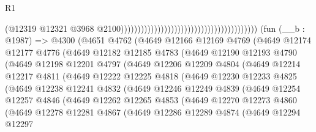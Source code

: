 \begin{lexlean}{R1}
\begin{coremodule}
                                                                                    (@12319
                                                                                      @12321
                                                                                      @3968
                                                                                      @2100)))))))))))))))))))))))))))))))))))))))))
    (fun (__b : @1987) =>
    @4300
      (@4651
        @4762
        (@4649
          @12166
          @12169
          @4769
          (@4649
            @12174
            @12177
            @4776
            (@4649
              @12182
              @12185
              @4783
              (@4649
                @12190
                @12193
                @4790
                (@4649
                  @12198
                  @12201
                  @4797
                  (@4649
                    @12206
                    @12209
                    @4804
                    (@4649
                      @12214
                      @12217
                      @4811
                      (@4649
                        @12222
                        @12225
                        @4818
                        (@4649
                          @12230
                          @12233
                          @4825
                          (@4649
                            @12238
                            @12241
                            @4832
                            (@4649
                              @12246
                              @12249
                              @4839
                              (@4649
                                @12254
                                @12257
                                @4846
                                (@4649
                                  @12262
                                  @12265
                                  @4853
                                  (@4649
                                    @12270
                                    @12273
                                    @4860
                                    (@4649
                                      @12278
                                      @12281
                                      @4867
                                      (@4649
                                        @12286
                                        @12289
                                        @4874
                                        (@4649
                                          @12294
                                          @12297

\end{coremodule}
\end{lexlean}
